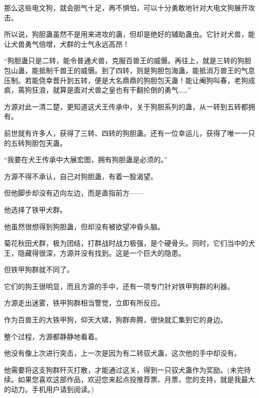 \begin{this_body}
那么这些电文狗，就会胆气十足，再不惧怕，可以十分勇敢地针对大电文狗展开攻击。

所以说，狗胆蛊虽然不是用来进攻的蛊，但却是绝好的辅助蛊虫。它针对犬兽，能让犬兽勇气倍增，犬群的士气永远高昂！

“狗胆蛊只是二转，能令普通犬兽，克服百兽王的威慑。再往上，就是三转的狗胆包山蛊，能抵制千兽王的威慑。到了四转，则是狗胆包海蛊，能抵消万兽王的气息压制。若能侥幸晋升到五转，便是大名鼎鼎的狗胆包天蛊！能让阉狗叫春，老狗成疯，蔫狗狂浪，就算是面对犬兽之皇也有干翻抡倒的勇气……”

方源对此一清二楚，更知道这犬王传承中，关于狗胆系列的蛊，从一转到五转都拥有。

前世就有许多人，获得了三转、四转的狗胆蛊。还有一位幸运儿，获得了唯一一只的五转狗胆包天蛊。

“我要在犬王传承中大展宏图，拥有狗胆蛊是必须的。”

方源不得不承认，自己对狗胆蛊，有着一股渴望。

但他脚步却没有迈向左边，而是直指前方——

他选择了铁甲犬群。

他虽然很想得到狗胆蛊，但却没有被欲望冲昏头脑。

菊花秋田犬群，极为团结，打群战时战力极强，是个硬骨头。同时，它们当中的犬王，隐藏得很深，方源并没有找到。这是一个巨大的隐患。

但铁甲狗群就不同了。

它们的狗王很明显，而且方源的手中，还有一项专门针对铁甲狗群的利器。

方源走出迷雾，铁甲狗群相当警觉，立即有所反应。

作为百兽王的大铁甲狗，仰天大啸，狗群奔腾，很快就汇集到它的身边。

整个过程，方源都静静地看着。

他没有像上次进行突击，上一次是因为有二转驭犬蛊，这次他的手中却没有。

他需要将这支狗群歼灭打散，才能通过这关，得到一只驭犬蛊作为奖励。(未完待续。如果您喜欢这部作品，欢迎您来起点投推荐票、月票，您的支持，就是我最大的动力。手机用户请到阅读。)

\end{this_body}

